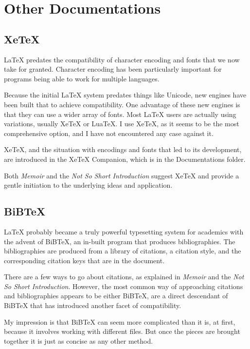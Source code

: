 \documentclass[11pt, oneside]{memoir}
\begin{document}
\section{Other Documentations}
\subsection{XeTeX}

LaTeX predates the compatibility of character encoding and fonts that we now take for granted. Character encoding has been particularly important for programs being able to work for multiple languages.

Because the initial LaTeX system predates things like Unicode, new engines have been built that to achieve compatibility. One advantage of these new engines is that they can use a wider array of fonts. Most LaTeX users are actually using variations, usually XeTeX or LuaTeX. I use XeTeX, as it seems to be the most comprehensive option, and I have not encountered any case against it.

XeTeX, and the situation with encodings and fonts that led to its development, are introduced in the XeTeX Companion, which is in the Documentations folder.

Both \emph{Memoir} and the \emph{Not So Short Introduction} suggest XeTeX and provide a gentle initiation to the underlying ideas and application.

\subsection{BiBTeX}

LaTeX probably became a truly powerful typesetting system for academics with the advent of BiBTeX, an in-built program that produces bibliographies. The bibliographies are produced from a library of citations, a citation style, and the corresponding citation keys that are in the document.

There are a few ways to go about citations, as explained in \emph{Memoir} and the \emph{Not So Short Introduction}. However, the most common way of approaching citations and bibliographies appears to be either BiBTeX, are a direct descendant of BiBTeX that has introduced another facet of compatibility.

My impression is that BiBTeX can seem more complicated than it is, at first, because it involves working with different files. But once the pieces are brought together it is just as concise as any other method.
\end{document}
